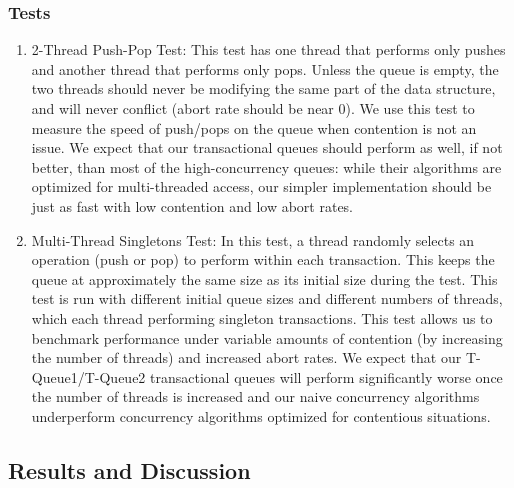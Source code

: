 \subsubsection{Tests}
\begin{enumerate}
\item 2-Thread Push-Pop Test: This test has one thread that performs only pushes and another thread that performs only pops. Unless the queue is empty, the two threads should never be modifying the same part of the data structure, and will never conflict (abort rate should be near 0). We use this test to measure the speed of push/pops on the queue when contention is not an issue. We expect that our transactional queues should perform as well, if not better, than most of the high-concurrency queues: while their algorithms are optimized for multi-threaded access, our simpler implementation should be just as fast with low contention and low abort rates.

\item Multi-Thread Singletons Test: 
    In this test, a thread randomly selects an operation (push or pop) to perform within each transaction. This keeps the queue at approximately the same size as its initial size during the test. This test is run with different initial queue sizes and different numbers of threads, which each thread performing singleton transactions. This test allows us to benchmark performance under variable amounts of contention (by increasing the number of threads) and increased abort rates. We expect that our T-Queue1/T-Queue2 transactional queues will perform significantly worse once the number of threads is increased and our naive concurrency algorithms underperform concurrency algorithms optimized for contentious situations.
    
    
\end{enumerate}

\subsection{Results and Discussion}


